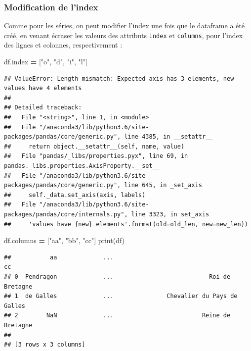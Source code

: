\documentclass[12pt,]{book}
\newenvironment{Shaded}{\begin{snugshade}}{\end{snugshade}}
\newcommand{\StringTok}[1]{\textcolor[rgb]{0.31,0.60,0.02}{#1}}
\newcommand{\OperatorTok}[1]{\textcolor[rgb]{0.81,0.36,0.00}{\textbf{#1}}}
\newcommand{\BuiltInTok}[1]{#1}
\newcommand{\NormalTok}[1]{#1}
\numberwithin{equation}{section}
\numberwithin{countremarque}{section}
\begin{document}
\subsubsection{Modification de l'index}\label{modification-de-lindex}

Comme pour les séries, on peut modifier l'index une fois que le
dataframe a été créé, en venant écraser les valeurs des attributs
\texttt{index} et \texttt{columns}, pour l'index des lignes et colonnes,
respectivement :

\begin{Shaded}
\begin{Highlighting}[]
\NormalTok{df.index }\OperatorTok{=}\NormalTok{ [}\StringTok{"o"}\NormalTok{, }\StringTok{"d"}\NormalTok{, }\StringTok{"i"}\NormalTok{, }\StringTok{"l"}\NormalTok{]}
\end{Highlighting}
\end{Shaded}

\begin{lstlisting}
## ValueError: Length mismatch: Expected axis has 3 elements, new values have 4 elements
## 
## Detailed traceback: 
##   File "<string>", line 1, in <module>
##   File "/anaconda3/lib/python3.6/site-packages/pandas/core/generic.py", line 4385, in __setattr__
##     return object.__setattr__(self, name, value)
##   File "pandas/_libs/properties.pyx", line 69, in pandas._libs.properties.AxisProperty.__set__
##   File "/anaconda3/lib/python3.6/site-packages/pandas/core/generic.py", line 645, in _set_axis
##     self._data.set_axis(axis, labels)
##   File "/anaconda3/lib/python3.6/site-packages/pandas/core/internals.py", line 3323, in set_axis
##     'values have {new} elements'.format(old=old_len, new=new_len))
\end{lstlisting}

\begin{Shaded}
\begin{Highlighting}[]
\NormalTok{df.columns }\OperatorTok{=}\NormalTok{ [}\StringTok{"aa"}\NormalTok{, }\StringTok{"bb"}\NormalTok{, }\StringTok{"cc"}\NormalTok{]}
\BuiltInTok{print}\NormalTok{(df)}
\end{Highlighting}
\end{Shaded}

\begin{lstlisting}
##           aa             ...                                        cc
## 0  Pendragon             ...                           Roi de Bretagne
## 1  de Galles             ...               Chevalier du Pays de Galles
## 2        NaN             ...                         Reine de Bretagne
## 
## [3 rows x 3 columns]
\end{lstlisting}
\end{document}
